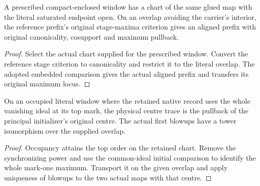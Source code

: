\begin{theorem}
\label{hir:g8-adopted-original-prefix-readback}
\leanok
A prescribed compact-enclosed window has a chart of the
same glued map with the literal saturated endpoint open.
On an overlap avoiding the carrier's interior, the reference
prefix's original stage-maxima criterion gives an aligned
prefix with original canonicality, cosupport and maximum
pullback.
\end{theorem}
\begin{proof}
Select the actual chart supplied for the prescribed window.
Convert the reference stage criterion to canonicality and
restrict it to the literal overlap. The adopted embedded
comparison gives the actual aligned prefix and transfers
its original maximum locus.
\end{proof}

\begin{theorem}
\label{hir:g8-adopted-principal-first-centre}
\leanok
On an occupied literal window where the retained native
record uses the whole vanishing ideal at its top mark, the
physical centre trace is the pullback of the principal
initializer's original centre. The actual first blowups
have a tower isomorphism over the supplied overlap.
\end{theorem}
\begin{proof}
Occupancy attains the top order on the retained chart.
Remove the synchronizing power and use the common-ideal
initial comparison to identify the whole mark-one maximum.
Transport it on the given overlap and apply uniqueness of
blowups to the two actual maps with that centre.
\end{proof}
